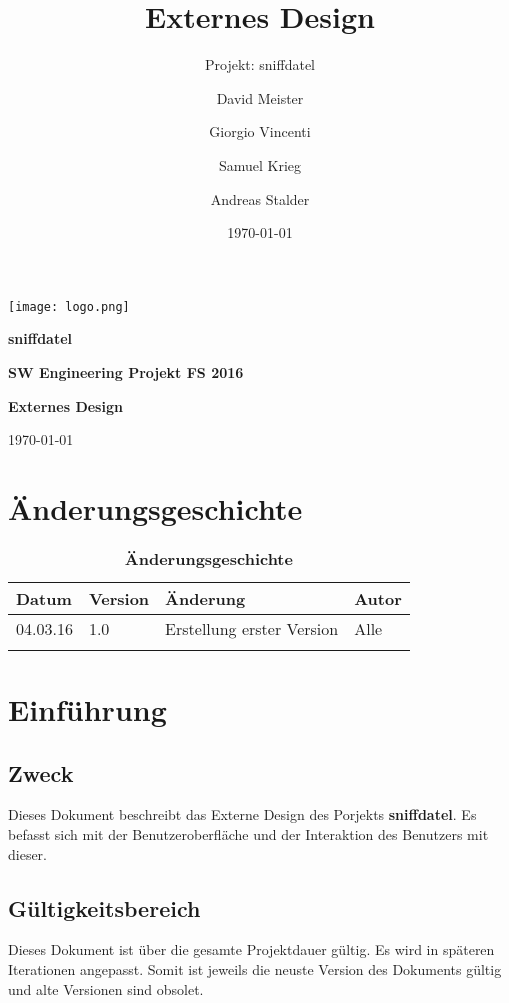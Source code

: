 \documentclass[a4,12pt]{scrartcl}
\title{Externes Design}
\subtitle{Projekt: sniffdatel}
\author{David Meister \and Giorgio Vincenti \and Samuel Krieg \and Andreas Stalder}
\date{\today}
\begin{document}
\begin{titlepage}
	\centering
	\vspace{5cm}
	\begin{center}
	\texttt{[image: logo.png]}
	\end{center}
	{\huge\bfseries sniffdatel\par}
	\vspace{8cm}
	\raggedright
	{\bfseries SW Engineering Projekt FS 2016\par}
	{\huge\bfseries Externes Design\par}
	\vspace{1cm}
	{\theauthor \par}
	{\today\par}

\end{titlepage}

\section{Änderungsgeschichte}

\begin{table}[htb]
\centering
    \begin{tabular}{@{} l l l l@{}}\toprule    
    {Datum} & {Version} & {Änderung} & {Autor}\\ \midrule
    04.03.16 & 1.0 & Erstellung erster Version & Alle\\ \addlinespace
    \bottomrule
    \end{tabular}
\caption{\textbf{Änderungsgeschichte}}
\end{table}
	\newpage
\tableofcontents
\newpage


\section{Einführung}
\subsection{Zweck}
Dieses Dokument beschreibt das Externe Design des Porjekts \textbf{sniffdatel}. Es befasst sich mit der Benutzeroberfläche und der Interaktion des Benutzers mit dieser. 
\subsection{Gültigkeitsbereich}
Dieses Dokument ist über die gesamte Projektdauer gültig. Es wird in späteren Iterationen angepasst. Somit ist jeweils die neuste Version des Dokuments gültig und alte Versionen sind obsolet.
\end{document}

